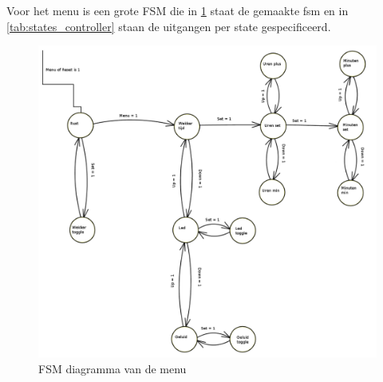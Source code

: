 Voor het menu is een grote FSM die in \cref{fig:FSM_controller} staat de gemaakte fsm en in \cref{tab:states_controller} staan de uitgangen per state gespecificeerd. 

\begin{figure}[ht!]
\includegraphics[width=\textwidth,height=\textheight,keepaspectratio]{Figuren/Controller/FSM_controller.png}
\caption{FSM diagramma van de menu}
\label{fig:FSM_controller}
\end{figure}

